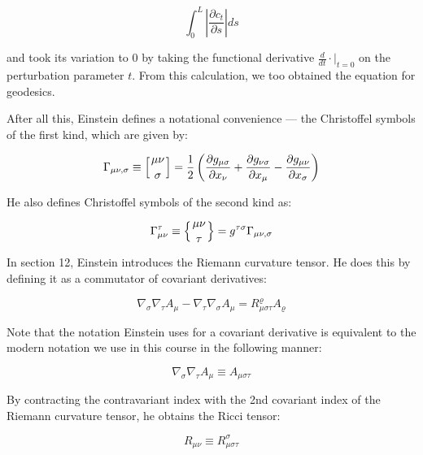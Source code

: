 \documentclass[14pt]{extarticle}
\newcommand{\christoffeltwo}[2]{\Gamma^{#1}_{#2}}
\newcommand{\christoffelone}[2]{\Gamma_{#1,#2}}
\newcommand{\reimann}[2]{R^{#1}_{#2}}
\newcommand{\ricci}[2]{R_{#1#2}}
\newcommand{\covtwo}[4]{\nabla_{#3} \nabla_{#4} {#1}_{#2}}
\begin{document}
\[ \int_0^L \left| \frac{\partial c_t}{\partial s} \right| ds \]

\noindent
and took its variation to 0 by taking the functional derivative ${\frac{d}{dt} \cdot |_{t=0}}$ on the perturbation parameter $t$. From this calculation, we too obtained the equation for geodesics.

After all this, Einstein defines a notational convenience --- the Christoffel symbols of the first kind, which are given by:

\[ \christoffelone{\mu\nu}{\sigma} \equiv \left[{\mu \nu \atop \sigma}\right] = {\frac {1}{2}}\left({\frac {\partial g_{\mu \sigma }}{\partial x_{\nu }}}+{\frac {\partial g_{\nu \sigma }}{\partial x_{\mu }}}-{\frac {\partial g_{\mu \nu }}{\partial x_{\sigma }}}\right) \]

He also defines Christoffel symbols of the second kind as:

\[\christoffeltwo{\tau}{\mu\nu} \equiv \left\{{\mu \nu \atop \tau}\right\} = g^{\tau \sigma} \christoffelone{\mu\nu}{\sigma}\]




In section 12, Einstein introduces the Riemann curvature tensor. He does this by defining it as a commutator of covariant derivatives:

\[\covtwo{A}{\mu}{\sigma}{\tau} - \covtwo{A}{\mu}{\tau}{\sigma} = \reimann{\varrho}{\mu\sigma\tau} A_\varrho\]


Note that the notation Einstein uses for a covariant derivative is equivalent to the modern notation we use in this course in the following manner:

\[\covtwo{A}{\mu}{\sigma}{\tau} \equiv A_{\mu\sigma\tau}\]

By contracting the contravariant index with the 2nd covariant index of the Riemann curvature tensor, he obtains the Ricci tensor:

\[\ricci{\mu}{\nu} \equiv \reimann{\sigma}{\mu\sigma\tau} \]
\end{document}
